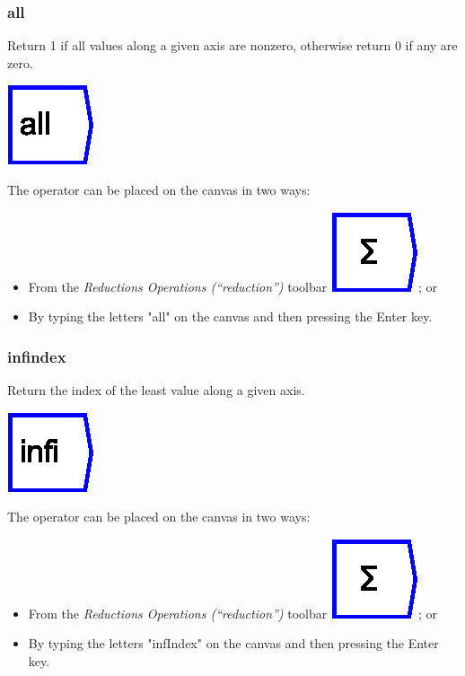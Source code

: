 \subsubsection{all}

\label{Operation:all} Return 1 if all values along a given axis are
nonzero, otherwise return 0 if any are zero.

\includegraphics{images/all}

The operator can be placed on the canvas in two ways:
\begin{itemize}
\item From the \emph{Reductions Operations (``reduction'')} toolbar \includegraphics{images/sum};
or 
\item By typing the letters "all" on the canvas and then pressing the
Enter key.
\end{itemize}

\subsubsection{infindex}

\label{Operation:infIndex} Return the index of the least value along
a given axis.

\includegraphics{images/infindex}

The operator can be placed on the canvas in two ways:
\begin{itemize}
\item From the \emph{Reductions Operations (``reduction'')} toolbar \includegraphics{images/sum};
or 
\item By typing the letters "infIndex" on the canvas and then pressing
the Enter key.
\end{itemize}

